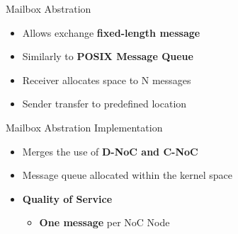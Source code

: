 		\begin{frame}[fragile]{Mailbox Abstration}
			\begin{itemize}
				\item Allows exchange \textbf{fixed-length message}
				\item Similarly to \textbf{POSIX Message Queue}
				\item Receiver allocates space to N messages
				\item Sender transfer to predefined location
			\end{itemize}

	
		\end{frame}

		\begin{frame}[fragile]{Mailbox Abstration Implementation}
			\begin{itemize}
				\item Merges the use of \textbf{D-NoC and C-NoC}
				\item Message queue allocated within the kernel space
				\item \textbf{Quality of Service}
				\begin{itemize}
					\item \textbf{One message} per NoC Node
				\end{itemize}
			\end{itemize}


			
		\end{frame}

